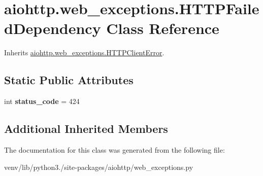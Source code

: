 \hypertarget{classaiohttp_1_1web__exceptions_1_1_h_t_t_p_failed_dependency}{}\section{aiohttp.\+web\+\_\+exceptions.\+H\+T\+T\+P\+Failed\+Dependency Class Reference}
\label{classaiohttp_1_1web__exceptions_1_1_h_t_t_p_failed_dependency}


Inherits \hyperlink{classaiohttp_1_1web__exceptions_1_1_h_t_t_p_client_error}{aiohttp.\+web\+\_\+exceptions.\+H\+T\+T\+P\+Client\+Error}.

\subsection*{Static Public Attributes}
\begin{DoxyCompactItemize}
\item 
\mbox{\label{classaiohttp_1_1web__exceptions_1_1_h_t_t_p_failed_dependency_a0ec99763ce826b63eb3a9bf4fd772b02}} 
int {\bfseries status\+\_\+code} = 424
\end{DoxyCompactItemize}
\subsection*{Additional Inherited Members}


The documentation for this class was generated from the following file\+:\begin{DoxyCompactItemize}
\item 
venv/lib/python3./site-\/packages/aiohttp/web\+\_\+exceptions.\+py\end{DoxyCompactItemize}
